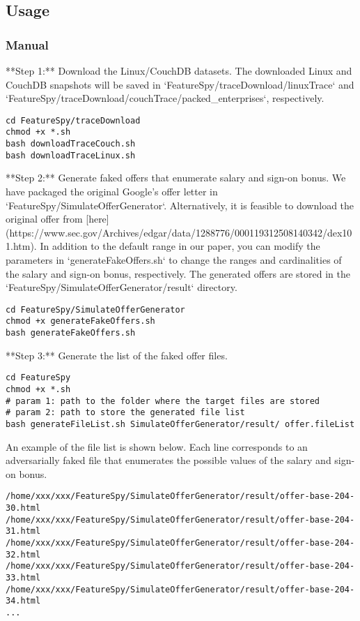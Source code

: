 \subsection{Usage}

\subsubsection{Manual}

**Step 1:** Download the Linux/CouchDB datasets. The downloaded Linux and CouchDB snapshots will be saved in `FeatureSpy/traceDownload/linuxTrace` and `FeatureSpy/traceDownload/couchTrace/packed\_enterprises`, respectively.

\begin{lstlisting}[style=shell]
cd FeatureSpy/traceDownload
chmod +x *.sh
bash downloadTraceCouch.sh
bash downloadTraceLinux.sh
\end{lstlisting}

**Step 2:** Generate faked offers that enumerate salary and sign-on bonus.  We have packaged the original Google's offer letter in `FeatureSpy/SimulateOfferGenerator`. Alternatively, it is feasible to download the original offer from [here](https://www.sec.gov/Archives/edgar/data/1288776/000119312508140342/dex101.htm). In addition to the default range in our paper, you can modify the parameters in `generateFakeOffers.sh` to change the ranges and cardinalities of the salary and sign-on bonus, respectively. The generated offers are stored in the `FeatureSpy/SimulateOfferGenerator/result` directory.

\begin{lstlisting}[style=shell]
cd FeatureSpy/SimulateOfferGenerator
chmod +x generateFakeOffers.sh
bash generateFakeOffers.sh
\end{lstlisting}

**Step 3:** Generate the list of the faked offer files.

\begin{lstlisting}[style=shell]
cd FeatureSpy
chmod +x *.sh
# param 1: path to the folder where the target files are stored
# param 2: path to store the generated file list
bash generateFileList.sh SimulateOfferGenerator/result/ offer.fileList
\end{lstlisting}

An example of the file list is shown below. Each line corresponds to an adversarially faked file that enumerates the possible values of the salary and sign-on bonus.

\begin{lstlisting}[style=c++]
/home/xxx/xxx/FeatureSpy/SimulateOfferGenerator/result/offer-base-204-30.html
/home/xxx/xxx/FeatureSpy/SimulateOfferGenerator/result/offer-base-204-31.html
/home/xxx/xxx/FeatureSpy/SimulateOfferGenerator/result/offer-base-204-32.html
/home/xxx/xxx/FeatureSpy/SimulateOfferGenerator/result/offer-base-204-33.html
/home/xxx/xxx/FeatureSpy/SimulateOfferGenerator/result/offer-base-204-34.html
...
\end{lstlisting}


